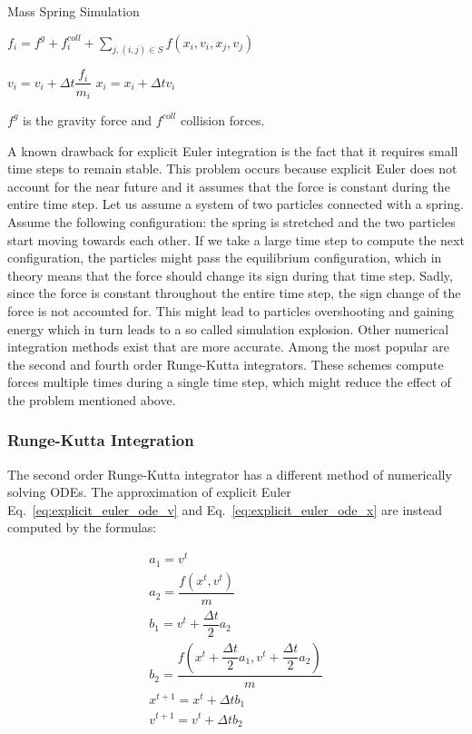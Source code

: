 \documentclass[en]{minipw} %
\begin{document}
\begin{algorithm}
\caption{Mass Spring Simulation}\label{euclid}
\begin{algorithmic}[1]
\State $f_i = f^{g} + f_{i}^{coll} + \sum_{j, (i,j) \in S} f(x_i, v_i, x_j, v_j)$
\EndFor

\State $v_{i} = v_{i} + \Delta t \dfrac{f_i}{m_i} $
\State $x_{i} = x_{i} + \Delta t v_i $
\EndFor

\EndWhile

\EndProcedure
\end{algorithmic}
\end{algorithm}

$f^{g}$ is the gravity force and $f^{coll}$ collision forces.

A known drawback for explicit Euler integration is the fact that it requires small time steps to remain stable. This problem occurs because explicit Euler does not account for the near future and it assumes that the force is constant during the entire time step. Let us assume a system of two particles connected with a spring. Assume the following configuration: the spring is stretched and the two particles start moving towards each other. If we take a large time step to compute the next configuration, the particles might pass the equilibrium configuration, which in theory means that the force should change its sign during that time step. Sadly, since the force is constant throughout the entire time step, the sign change of the force is not accounted for. This might lead to particles overshooting and gaining energy which in turn leads to a so called simulation explosion.
Other numerical integration methods exist that are more accurate. Among the most popular are the second and fourth order Runge-Kutta integrators. These schemes compute forces multiple times during a single time step, which might reduce the effect of the problem mentioned above.

\subsubsection{Runge-Kutta Integration}
The second order Runge-Kutta integrator has a different method of numerically solving ODEs. The approximation of explicit Euler Eq.~\ref{eq:explicit_euler_ode_v} and Eq.~\ref{eq:explicit_euler_ode_x} are instead computed by the formulas:


\begin{equation}
\begin{aligned}
a_1 = v^t
\\
a_2 = \dfrac{f(x^t, v^t)}{m}
\\
b_1 = v^t + \dfrac{\Delta t}{2} a_2
\\
b_2 = \dfrac{f(x^t + \dfrac{\Delta t}{2} a_1, v^t + \dfrac{\Delta t}{2} a_2)}{m}
\\
x^{t+1} = x^{t} + \Delta t b_1
\\
v^{t+1} = v^{t} + \Delta t b_2
\end{aligned}
\end{equation}
\end{document}
